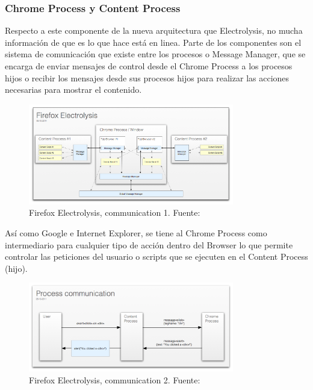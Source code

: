     \subsubsection{Chrome Process y Content Process}
    Respecto a este componente de la nueva arquitectura que Electrolysis, no mucha información de que es lo que hace está en linea. Parte de los componentes son el sistema de comunicación que existe entre los procesos o Message Manager, que se encarga de enviar mensajes de control desde el Chrome Process a los procesos hijos o recibir los mensajes desde sus procesos hijos para realizar las acciones necesarias para mostrar el contenido.
        \begin{figure}[h!t]
            \centering
            \includegraphics[width=0.8\textwidth]{figures/electrolysis.png}
            \caption{Firefox Electrolysis, communication 1. Fuente: \cite{Firefox101}}
            \label{fig:ChromePComm1}
        \end{figure}

    Así como Google e Internet Explorer, se tiene al Chrome Process como intermediario para cualquier tipo de acción dentro del Browser lo que permite controlar las peticiones del usuario o scripts que se ejecuten en el Content Process (hijo).

        \begin{figure}[h!t]
            \centering
            \includegraphics[width=0.8\textwidth]{figures/e10s-processes.png}
            \caption{Firefox Electrolysis, communication 2. Fuente: \cite{Firefox101}}
            \label{fig:ChromePComm2}
        \end{figure}

